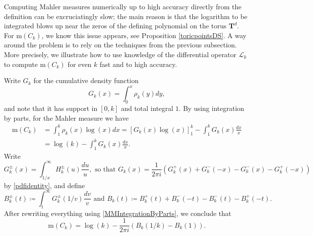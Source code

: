 \documentclass[12pt,reqno]{amsart}
\theoremstyle{definition}
\theoremstyle{plain}
\theoremstyle{definition}
\newcommand{\T}{\mathbf{T}}
\newcommand\m{\mathrm{m}}
\begin{document}
Computing Mahler measures numerically up to high accuracy directly from the definition can be excruciatingly slow; the main reason is that the logarithm to be integrated blows up near the zeros of the defining polynomial on the torus $\T^d$. For $\m(C_k)$, we know this issue appears, see Proposition \ref{toricpointsDS}. A way around the problem is to rely on the techniques from the previous subsection. More precisely, 
we illustrate how to use knowledge of the differential operator $\mathcal L_k$ to compute $\m(C_k)$ for even $k$ fast and to high accuracy. 

Write $G_k$ for the cumulative density function 
\[
G_k(x) = \int_{0}^x \rho_k(y) d y, 
\]
and note that it has support in $[0,k]$ and total integral $1$. 
By using integration by parts, for the Mahler measure we have
\begin{align}
	\label{MMIntegrationByParts}
\m (C_k) & = \int_1^{k} \rho_k(x) \log(x) d x = [G_k(x) \log(x)]_{1}^k - \int_1^{k} G_k(x) \frac{d x}{x} \nonumber \\ &= \log(k) - \int_1^{k} G_k(x) \frac{d x}{x}.
\end{align}
Write \[
G_k^{\pm}(x) = \int_{1/x}^{\infty} H_k^{\pm}(u) \frac{d u}{u},
\mbox{ 
so that } 
G_k(x) =\frac{1}{2 \pi i} \left( G^{+}_k(x) + G^{-}_k(-x) - G^{-}_k(x) - G^{+}_k(-x) \right)
\]
by \eqref{pdfidentity}, and define
\[
B^{\pm}_k(t) \coloneqq  \int_{t}^\infty G_{k}^{\pm}(1/v) \frac{d v}{v}
\mbox{ 
and }
B_k(t) \coloneqq  B^{+}_k(t) + B^{-}_k(-t) - B^{-}_k(t) - B^{+}_k(-t).
\]
After rewriting everything using \eqref{MMIntegrationByParts}, we conclude that
\begin{equation}
	\label{MahlerNumerical}
	\m (C_k) =  \log(k) - \frac{1}{2 \pi i} \left(B_k(1/k) - B_k(1)\right). 
\end{equation}
\end{document}

